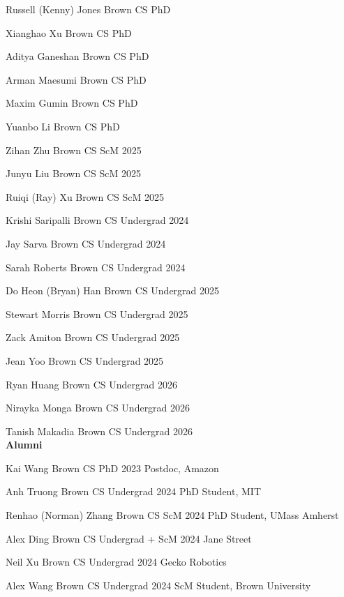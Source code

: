 \documentclass[line,margin]{res}
\begin{document}
\begin{resume}
\currentphd
{Russell (Kenny) Jones}
{Brown CS PhD}

\currentphd
{Xianghao Xu}
{Brown CS PhD}

\currentphd
{Aditya Ganeshan}
{Brown CS PhD}

\currentphd
{Arman Maesumi}
{Brown CS PhD}

\currentphd
{Maxim Gumin}
{Brown CS PhD}

\currentphd
{Yuanbo Li}
{Brown CS PhD}

\student
{Zihan Zhu}
{Brown CS ScM}
{2025}

\student
{Junyu Liu}
{Brown CS ScM}
{2025}

\student
{Ruiqi (Ray) Xu}
{Brown CS ScM}
{2025}

\student
{Krishi Saripalli}
{Brown CS Undergrad}
{2024}

\student
{Jay Sarva}
{Brown CS Undergrad}
{2024}

\student
{Sarah Roberts}
{Brown CS Undergrad}
{2024}

\student
{Do Heon (Bryan) Han}
{Brown CS Undergrad}
{2025}

\student
{Stewart Morris}
{Brown CS Undergrad}
{2025}

\student
{Zack Amiton}
{Brown CS Undergrad}
{2025}

\student
{Jean Yoo}
{Brown CS Undergrad}
{2025}

\student
{Ryan Huang}
{Brown CS Undergrad}
{2026}

\student
{Nirayka Monga}
{Brown CS Undergrad}
{2026}

\student
{Tanish Makadia}
{Brown CS Undergrad}
{2026}
\\


\textbf{Alumni}

\alumni
{Kai Wang}
{Brown CS PhD}
{2023}
{Postdoc, Amazon}

\alumni
{Anh Truong}
{Brown CS Undergrad}
{2024}
{PhD Student, MIT}

\alumni
{Renhao (Norman) Zhang}
{Brown CS ScM}
{2024}
{PhD Student, UMass Amherst}


\alumni
{Alex Ding}
{Brown CS Undergrad + ScM}
{2024}
{Jane Street}

\alumni
{Neil Xu}
{Brown CS Undergrad}
{2024}
{Gecko Robotics}

\alumni
{Alex Wang}
{Brown CS Undergrad}
{2024}
{ScM Student, Brown University}


\end{resume}
\end{document}
